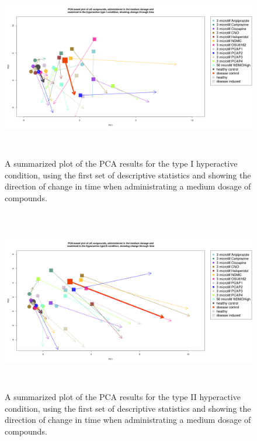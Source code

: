 \documentclass[a4paper,12pt]{article}
\begin{document}
\newpage
\begin{figure}[h!]
\begin{center}
\includegraphics[width=16cm,height=8cm]{All_together_3_microM_DarkApoHigh_in_time.png}
\caption{A summarized plot of the PCA results for the type I hyperactive condition, using the first set of descriptive statistics and showing the direction of change in time when administrating a medium dosage of compounds.}
\end{center}
\end{figure}
\newpage
\begin{figure}[h!]
\begin{center}
\includegraphics[width=16cm,height=8cm]{All_together_3_microM_DarkPTZ_in_time.png}
\caption{A summarized plot of the PCA results for the type II hyperactive condition, using the first set of descriptive statistics and showing the direction of change in time when administrating a medium dosage of compounds.}
\end{center}
\end{figure}
\end{document}
